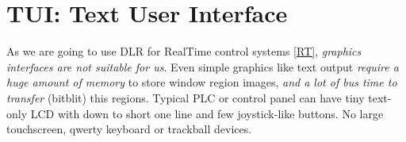 \chapter{TUI: Text User Interface}\label{TUI}\clearpage

As we are going to use DLR for RealTime control systems \ref{RT},
\textit{graphics interfaces are not suitable for us}. Even simple graphics like
text output \emph{require a huge amount of memory} to store window region
images, \emph{and a lot of bus time to transfer} (bitblit) this regions. Typical
PLC or control panel can have tiny text-only LCD with down to short one line and
few joystick-like buttons. No large touchscreen, qwerty keyboard or trackball
devices.

